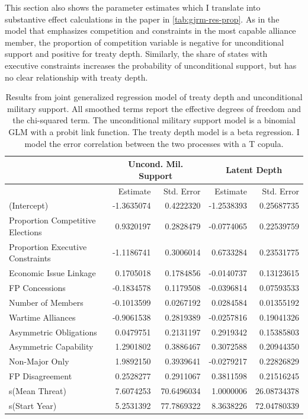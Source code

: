 \documentclass[12pt]{article}
\begin{document}
This section also shows the parameter estimates which I translate into substantive effect calculations in the paper in \autoref{tab:gjrm-res-prop}. 
As in the model that emphasizes competition and constraints in the most capable alliance member, the proportion of competition variable is negative for unconditional support and positive for treaty depth. 
Similarly, the share of states with executive constraints increases the probability of unconditional support, but has no clear relationship with treaty depth. 


\begin{table}[ht]
\centering
\begin{tabular}{lrrrr}
  & \multicolumn{2}{c}{Uncond. Mil. Support} & \multicolumn{2}{c}{Latent Depth}\\ \hline
   & Estimate & Std. Error & Estimate & Std. Error \\ 
  \hline
(Intercept) & -1.3635074 & 0.4222320 & -1.2538393 & 0.25687735 \\ 
  Proportion Competitive Elections & 0.9320197 & 0.2828479 & -0.0774065 & 0.22539759 \\ 
  Proportion Executive Constraints & -1.1186741 & 0.3006014 & 0.6733284 & 0.23531775 \\ 
  Economic Issue Linkage & 0.1705018 & 0.1784856 & -0.0140737 & 0.13123615 \\ 
  FP Concessions & -0.1834578 & 0.1179508 & -0.0396814 & 0.07593533 \\ 
  Number of Members & -0.1013599 & 0.0267192 & 0.0284584 & 0.01355192 \\ 
  Wartime Alliances & -0.9061538 & 0.2819389 & -0.0257816 & 0.19041326 \\ 
  Asymmetric Obligations & 0.0479751 & 0.2131197 & 0.2919342 & 0.15385803 \\ 
  Asymmetric Capability & 1.2901802 & 0.3886467 & 0.3072588 & 0.20944350 \\ 
  Non-Major Only & 1.9892150 & 0.3939641 & -0.0279217 & 0.22826829 \\ 
  FP Disagreement & 0.2528277 & 0.2911067 & 0.3811598 & 0.21516245 \\ 
  s(Mean Threat) & 7.6074253 & 70.6496034 & 1.0000006 & 26.08734378 \\ 
  s(Start Year) & 5.2531392 & 77.7869322 & 8.3638226 & 72.04780339 \\ 
   \hline
\end{tabular}
\caption{Results from joint generalized regression model of treaty depth and unconditional military support. 
                     All smoothed terms report the effective degrees of freedom and the chi-squared term. 
                     The unconditional military support model is a binomial GLM with a probit link function. 
                     The treaty depth model is a beta regression. 
                     I model the error correlation between the two processes with a T copula.} 
\label{tab:gjrm-res-.prop}
\end{table}
\end{document}
